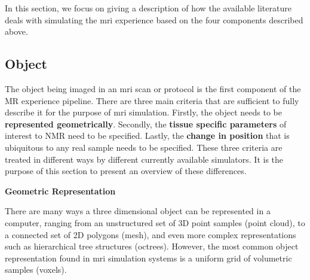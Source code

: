 In this section, we focus on giving a description of how the available literature deals with simulating the \ac{mri} experience based on the four components described above.

\hfill

\subsection{Object}

The object being imaged in an \ac{mri} scan or protocol is the first component of the MR experience pipeline.
There are three main criteria that are sufficient to fully describe it for the purpose of \ac{mri} simulation.
Firstly, the object needs to be \textbf{represented geometrically}. 
Secondly, the \textbf{tissue specific parameters} of interest to NMR need to be specified.
Lastly, the \textbf{change in position} that is ubiquitous to any real sample needs to be specified.
These three criteria are treated in different ways by different currently available simulators. 
It is the purpose of this section to present an overview of these differences.

\hfill

\large \textbf{Geometric Representation} \normalsize

There are many ways a three dimensional object can be represented in a computer, ranging from an unstructured set of 3D point samples (point cloud), to a connected set of 2D polygons (mesh), and even more complex representations such as hierarchical tree structures (octrees).
However, the most common object representation found in \ac{mri} simulation systems is a uniform grid of volumetric samples (voxels).

\hfill

